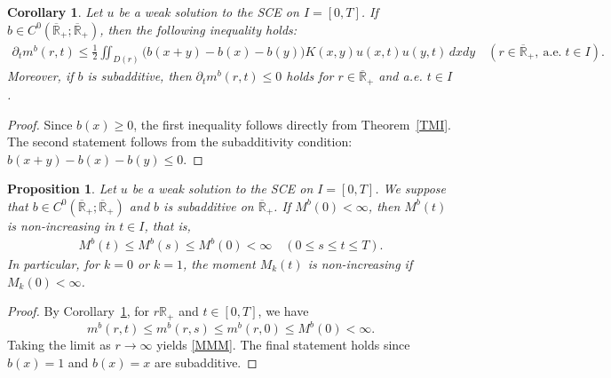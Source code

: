 \documentclass[a4paper,11pt]{article}
\newtheorem{prop}[thm]{Proposition}
\newtheorem{cor}[thm]{Corollary}
\def\Rp{{\mathbb R}_+}
\def\Rb{\overline{{\mathbb R}}_+}
\begin{document}
\begin{cor} \label{truncated moment identity cor}
  Let $u$ be a weak solution to the SCE on $I=[0,T]$. If $b\in C^0(\Rb;\Rb )$, then the following inequality holds:
  \begin{align*}
    \partial_t m^b(r,t)\leq\frac{1}{2}\iint_{D(r)}\big(b(x+y)-b(x)-b(y)\big)K(x,y)u(x,t)u(y,t)\,dxdy\quad
    (r\in \Rb,~\text{a.e.}\;t\in I).
  \end{align*}
Moreover, if $b$ is subadditive, then $\partial_t m^b(r,t)\leq 0$ holds for $r\in\Rb$ and a.e. $t\in I$.
\end{cor}
\begin{proof}
Since $b(x)\ge 0$, the first inequality follows directly from Theorem~\ref{TMI}. The second statement follows from the subadditivity condition: $b(x+y)-b(x)-b(y)\le 0$.
\end{proof}

\begin{prop}\label{Monotonically decreasing property of the moment}
Let $u$ be a weak solution to the SCE on $I=[0,T]$. 
We suppose that $b\in C^0(\Rb;\Rb)$ and $b$ is subadditive on $\Rb$.
If $M^b(0)<\infty$, then $M^b(t)$ is non-increasing in $t\in I$, that is, 
\begin{align}\label{MMM}
M^b(t)\le M^b(s)\le M^b(0)<\infty\quad (0\le s\le t\le T).
\end{align}
In particular, for $k=0$ or $k=1$, the moment $M_k(t)$ is non-increasing if $M_k(0)<\infty$. 
\end{prop}
\begin{proof}
By Corollary~\ref{truncated moment identity cor}, for $r\Rp$ and $t\in [0,T]$, we have
\[
m^b(r,t)\le m^b(r,s)\le m^b(r,0) \le M^b(0)<\infty.
\]
Taking the limit as $r\to \infty$ yields \eqref{MMM}. The final statement holds since $b(x)=1$ and $b(x)=x$ are subadditive.
\end{proof}
\end{document}
